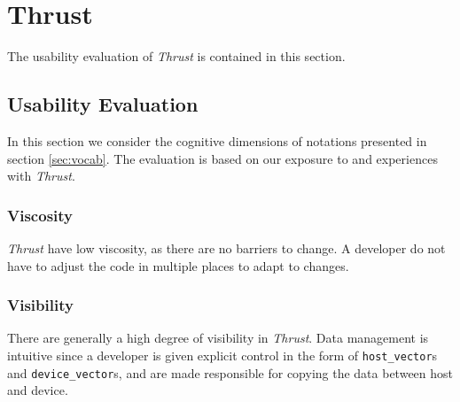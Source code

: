 \section{Thrust}
The usability evaluation of \textit{Thrust} is contained in this section.






\subsection{Usability Evaluation}
In this section we consider the cognitive dimensions of notations presented in section \ref{sec:vocab}. The evaluation is based on our exposure to and experiences with \textit{Thrust}.

\subsubsection[*]{Viscosity}
\textit{Thrust} have low viscosity, as there are no barriers to change. A developer do not have to adjust the code in multiple places to adapt to changes. 

\subsubsection[*]{Visibility}
There are generally a high degree of visibility in \textit{Thrust}. Data management is intuitive since a developer is given explicit control in the form of \texttt{host\_vector}s and \texttt{device\_vector}s, and are made responsible for copying the data between host and device. 


